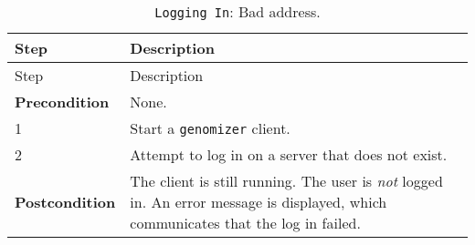 \begin{longtable}[c]{@{}ll@{}}
\caption{\texttt{Logging\ In}: Bad address.}\tabularnewline
\toprule
\begin{minipage}[b]{0.31\columnwidth}\raggedright\strut
Step
\strut\end{minipage} &
\begin{minipage}[b]{0.63\columnwidth}\raggedright\strut
Description
\strut\end{minipage}\tabularnewline
\midrule
\endfirsthead
\toprule
\begin{minipage}[b]{0.31\columnwidth}\raggedright\strut
Step
\strut\end{minipage} &
\begin{minipage}[b]{0.63\columnwidth}\raggedright\strut
Description
\strut\end{minipage}\tabularnewline
\midrule
\endhead
\begin{minipage}[t]{0.31\columnwidth}\raggedright\strut
\textbf{Precondition}
\strut\end{minipage} &
\begin{minipage}[t]{0.63\columnwidth}\raggedright\strut
None.
\strut\end{minipage}\tabularnewline
\begin{minipage}[t]{0.31\columnwidth}\raggedright\strut
1
\strut\end{minipage} &
\begin{minipage}[t]{0.63\columnwidth}\raggedright\strut
Start a \texttt{genomizer} client.
\strut\end{minipage}\tabularnewline
\begin{minipage}[t]{0.31\columnwidth}\raggedright\strut
2
\strut\end{minipage} &
\begin{minipage}[t]{0.63\columnwidth}\raggedright\strut
Attempt to log in on a server that does not exist.
\strut\end{minipage}\tabularnewline
\begin{minipage}[t]{0.31\columnwidth}\raggedright\strut
\textbf{Postcondition}
\strut\end{minipage} &
\begin{minipage}[t]{0.63\columnwidth}\raggedright\strut
The client is still running. The user is \emph{not} logged in. An error
message is displayed, which communicates that the log in failed.
\strut\end{minipage}\tabularnewline
\bottomrule
\end{longtable}

\pagebreak

